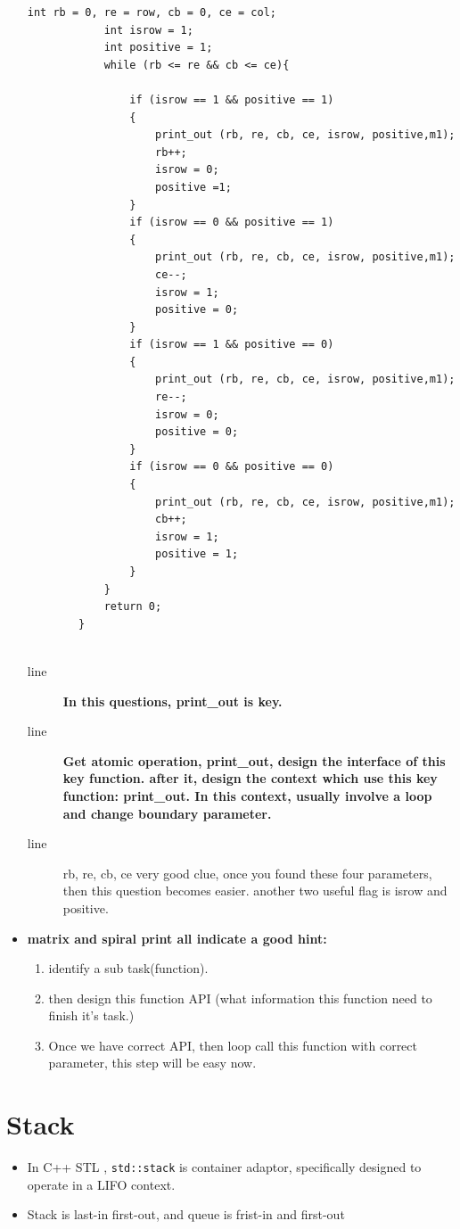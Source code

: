 \documentclass[a4paper,11pt,twoside]{book}
\begin{document}
\begin{itemize}
\begin{lstlisting}[numbers=none]
			int rb = 0, re = row, cb = 0, ce = col;
			int isrow = 1;
			int positive = 1;
			while (rb <= re && cb <= ce){
				
				if (isrow == 1 && positive == 1)
				{
					print_out (rb, re, cb, ce, isrow, positive,m1);
					rb++;
					isrow = 0;
					positive =1;
				}
				if (isrow == 0 && positive == 1)
				{
					print_out (rb, re, cb, ce, isrow, positive,m1);
					ce--;
					isrow = 1;
					positive = 0;
				}
				if (isrow == 1 && positive == 0)
				{
					print_out (rb, re, cb, ce, isrow, positive,m1);
					re--;
					isrow = 0;
					positive = 0;
				}
				if (isrow == 0 && positive == 0)
				{
					print_out (rb, re, cb, ce, isrow, positive,m1);
					cb++;
					isrow = 1;
					positive = 1;
				}
			}
			return 0;
		}	
		
	\end{lstlisting}		
	
	\begin{description}
		\item[line ] \textbf{In this questions, print\_out is key. }
		\item[line ] \textbf{Get atomic operation, print\_out, design the interface of this key function. after it, design the context which use this key function: print\_out. In this context, usually involve a loop and change boundary parameter.}
		
		\item[line ] rb, re, cb, ce very good clue, once you found these four parameters, then this question becomes easier. another two useful flag is isrow and positive. 
	\end{description}
	
	\item \textbf{matrix and spiral print all indicate a good hint:} 
	\begin{enumerate}
		\item identify a sub task(function).
		
		\item then design this function API (what information this function need to finish it's task.) 
		
		\item Once we have correct API, then loop call this function with correct parameter, this step will be easy now. 
	\end{enumerate}
	
\end{itemize}

 
\section{Stack}
\begin{itemize}
	\item In C++ STL , \texttt{std::stack} is container adaptor, specifically designed to operate in a LIFO context. 

	\item Stack is last-in first-out, and queue is frist-in and first-out
\end{itemize}
\end{document}
